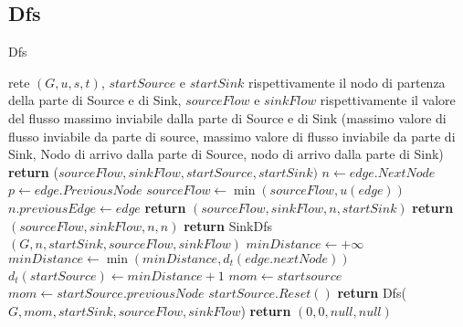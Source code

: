 \documentclass{article}
\begin{document}
\subsection{Dfs}
\begin{algorithm}
\caption{Dfs}
\begin{algorithmic}[1]
\REQUIRE rete $(G,u,s,t)$, $startSource$ e $startSink$ rispettivamente il nodo di partenza della parte di Source e di Sink, $sourceFlow$ e $sinkFlow$ rispettivamente il valore del flusso massimo inviabile dalla parte di Source e di Sink
\ENSURE (massimo valore di flusso inviabile da parte di source, massimo valore di flusso inviabile da parte di Sink, Nodo di arrivo dalla parte di Source, nodo di arrivo dalla parte di Sink)
\STATE \textbf{return} ($sourceFlow,sinkFlow,startSource,startSink)$ 
\ENDIF
{}
\STATE $n \leftarrow edge.NextNode$
\STATE $p \leftarrow edge.PreviousNode$
\STATE $sourceFlow \leftarrow \min(sourceFlow,u(edge))$
\STATE $ n.previousEdge \leftarrow edge$ 
\STATE \textbf{return } $(sourceFlow, sinkFlow,n,startSink)$
\ENDIF
{}
\STATE \textbf{return}  $(sourceFlow, sinkFlow,n,n)$
\ENDIF
\STATE \textbf{return} SinkDfs$(G,n, startSink, sourceFlow, sinkFlow)$
\ENDIF
\ENDFOR
\STATE $minDistance \leftarrow +\infty$
\STATE $minDistance \leftarrow \min(minDistance, d_t(edge.nextNode))$ 
\ENDIF
\ENDFOR
\STATE$d_t(startSource) \leftarrow minDistance+1$
\STATE $mom \leftarrow startsource$
\ELSE
\STATE $mom \leftarrow startSource.previousNode$ 
\ENDIF
\STATE $startSource.Reset()$
\STATE \textbf{return} Dfs($G,mom, startSink, sourceFlow, sinkFlow$)
\ENDIF 
\STATE \textbf{return} $(0,0,null,null)$
\end{algorithmic}
\end{algorithm}
\end{document}

